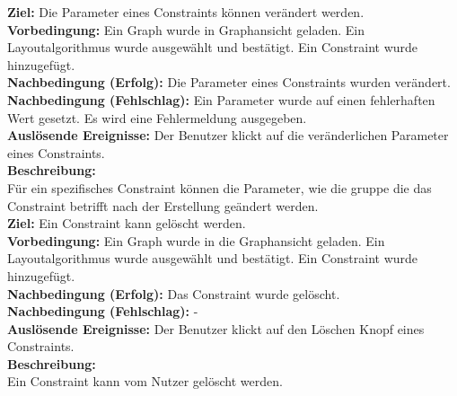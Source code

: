 \label{fa:constraintsettings}
\textbf{Ziel:} Die Parameter eines Constraints können verändert werden. \\
\textbf{Vorbedingung:} Ein Graph wurde in Graphansicht geladen. Ein Layoutalgorithmus wurde ausgewählt und bestätigt. Ein Constraint wurde hinzugefügt. \\
\textbf{Nachbedingung (Erfolg):} Die Parameter eines Constraints wurden verändert. \\
\textbf{Nachbedingung (Fehlschlag):} Ein Parameter wurde auf einen fehlerhaften Wert gesetzt. Es wird eine Fehlermeldung ausgegeben. \\
\textbf{Auslösende Ereignisse:} Der Benutzer klickt auf die veränderlichen Parameter eines Constraints. \\
\textbf{Beschreibung:}\\
Für ein spezifisches Constraint können die Parameter, wie die \gls{gruppe} die das Constraint betrifft nach der Erstellung geändert werden.\\

\label{fa:deleteconstraint}
\textbf{Ziel:} Ein Constraint kann gelöscht werden. \\
\textbf{Vorbedingung:} Ein Graph wurde in die Graphansicht geladen. Ein Layoutalgorithmus wurde ausgewählt und bestätigt. Ein Constraint wurde hinzugefügt. \\
\textbf{Nachbedingung (Erfolg):} Das Constraint wurde gelöscht. \\
\textbf{Nachbedingung (Fehlschlag):} - \\
\textbf{Auslösende Ereignisse:} Der Benutzer klickt auf den Löschen Knopf eines Constraints. \\
\textbf{Beschreibung:}\\
Ein Constraint kann vom Nutzer gelöscht werden.\\

